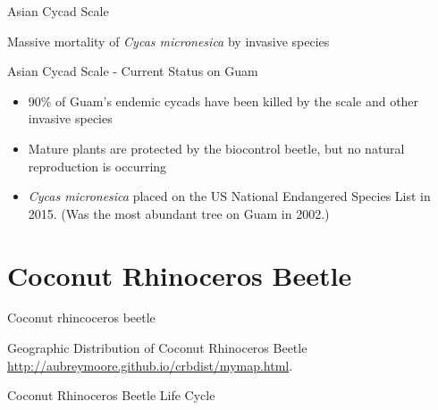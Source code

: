 \documentclass[]{beamer}
\begin{document}
\begin{frame}{Asian Cycad Scale}
\end{frame}

\begin{frame}{Massive mortality of \textit{Cycas micronesica} by invasive species}
\end{frame}

\begin{frame}{Asian Cycad Scale - Current Status on Guam}
	\begin{itemize}
		\item 90\% of Guam's endemic cycads have been killed by the scale and other invasive species
		\item Mature plants are protected by the biocontrol beetle, but no natural reproduction is occurring
		\item \textit{Cycas micronesica} placed on the US National Endangered Species List in 2015. (Was the most abundant tree on Guam in 2002.)
	\end{itemize}
\end{frame}

\section*{Coconut Rhinoceros Beetle}

\begin{frame}{Coconut rhincoceros beetle}
\end{frame}

\begin{frame}{Geographic Distribution of Coconut Rhinoceros Beetle}
 \\
\url{http://aubreymoore.github.io/crbdist/mymap.html}.
\end{frame}

\begin{frame}{Coconut Rhinoceros Beetle Life Cycle}
\end{frame}
\end{document}
